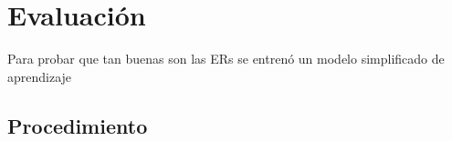 \section{Evaluaci\'on}
\label{corpus-evaluacion}


Para probar que tan buenas son las ERs se entren\'o un modelo simplificado de aprendizaje 


\subsection{Procedimiento}



